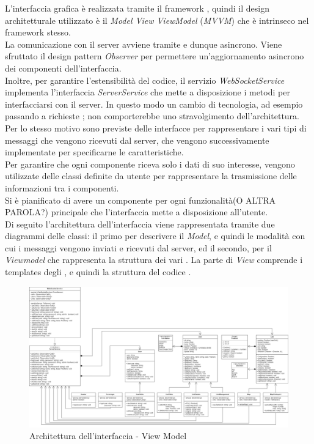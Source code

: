 L'interfaccia grafica è realizzata tramite il framework , quindi il design architetturale utilizzato è il \textit{Model View ViewModel} (\textit{MVVM}) che è intrinseco nel framework stesso. \\
La comunicazione con il server avviene tramite  e dunque asincrono. Viene sfruttato il design pattern \textit{Observer} per permettere un'aggiornamento asincrono dei componenti dell'interfaccia.\\
Inoltre, per garantire l'estensibilità del codice, il servizio \textit{WebSocketService} implementa l'interfaccia \textit{ServerService} che mette a disposizione i metodi per interfacciarsi con il server. In questo modo un cambio di tecnologia, ad esempio passando a richieste ; non comporterebbe uno stravolgimento dell'architettura. \\
Per lo stesso motivo sono previste delle interfacce per rappresentare i vari tipi di messaggi che vengono ricevuti dal server, che vengono successivamente implementate per specificarne le caratteristiche. \\
Per garantire che ogni componente riceva solo i dati di suo interesse, vengono utilizzate delle classi definite da utente per rappresentare la trasmissione delle informazioni tra i componenti. \\
Si è pianificato di avere un componente per ogni funzionalità(O ALTRA PAROLA?) principale che l'interfaccia mette a disposizione all'utente. \\
\newline
Di seguito l'architettura dell'interfaccia viene rappresentata tramite due diagrammi delle classi: il primo per descrivere il \textit{Model}, e quindi le modalità con cui i messaggi vengono inviati e ricevuti dal server, ed il secondo, per il \textit{Viewmodel} che rappresenta la struttura dei vari . La parte di \textit{View} comprende i templates degli , e quindi la struttura del codice . \\


\newpage

\begin{landscape}
	\begin{figure}[h!]
		\includegraphics[width=24cm]{img/ui component.png}
		\caption{Architettura dell'interfaccia - View Model}
	\end{figure}
\end{landscape}
\newpage

